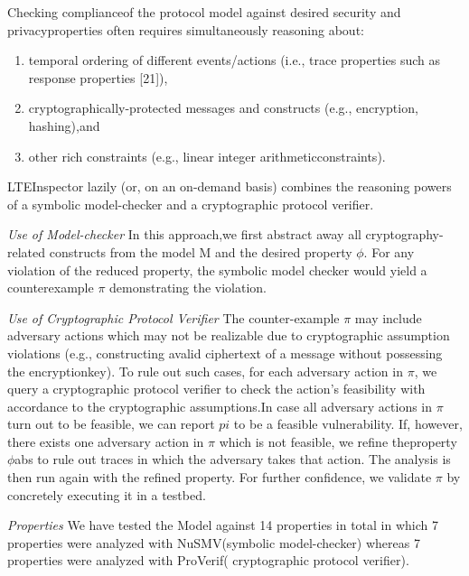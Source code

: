 \documentclass[acmsmall,review,authorversion]{acmart}
\begin{document}
Checking complianceof the protocol model against desired security and privacyproperties often requires simultaneously reasoning about:
\begin{enumerate}
 \item temporal ordering of different events/actions (i.e., trace properties such as response properties [21]), 
\item cryptographically-protected messages and constructs (e.g., encryption, hashing),and 
\item  other rich constraints (e.g., linear integer arithmeticconstraints).
\end{enumerate}
LTEInspector lazily (or, on an on-demand basis) combines the reasoning powers of a symbolic model-checker and a cryptographic protocol verifier. 

\textit{Use of Model-checker}
 In this approach,we first abstract away all cryptography-related constructs from the model M and the desired property $\phi$. For any violation of the reduced property,  the symbolic model checker would yield a counterexample $\pi$ demonstrating the violation. 

\textit{Use of Cryptographic Protocol Verifier}
The counter-example $\pi$ may include adversary actions which may not be realizable due to cryptographic assumption violations (e.g., constructing avalid ciphertext of a message without possessing the encryptionkey). To rule out such cases, for each adversary action in $\pi$, we query a cryptographic protocol verifier to check the action’s feasibility with accordance to the cryptographic assumptions.In case all adversary actions in $\pi$ turn out to be feasible, we can report $pi$ to be a feasible vulnerability. If, however, there exists one adversary action in $\pi$ which is not feasible, we refine theproperty $\phi$abs to rule out traces in which the adversary takes that action. The analysis is then run again with the refined property. For further confidence, we validate $\pi$ by concretely executing it in a testbed.

\textit{Properties}
We have tested the Model against 14 properties in total in which 7 properties were analyzed with NuSMV(symbolic model-checker) whereas 7 properties were analyzed with ProVerif( cryptographic protocol verifier).
\end{document}
